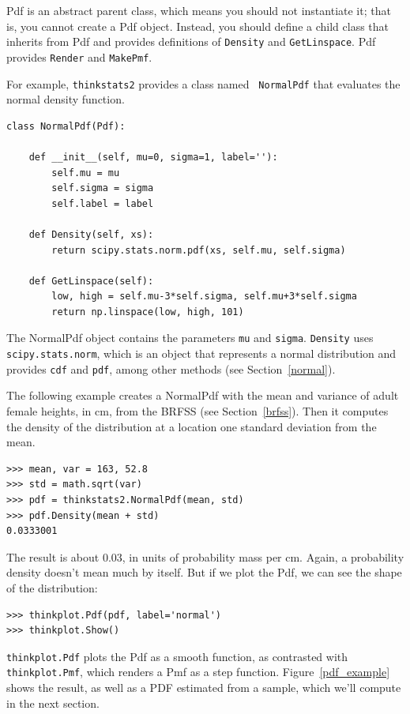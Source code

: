 \documentclass[12pt]{book}
\begin{document}
Pdf is an abstract parent class, which means you should not
instantiate it; that is, you cannot create a Pdf object.  Instead, you
should define a child class that inherits from Pdf and provides
definitions of {\tt Density} and {\tt GetLinspace}.  Pdf provides
{\tt Render} and {\tt MakePmf}.

For example, {\tt thinkstats2} provides a class named {\tt
  NormalPdf} that evaluates the normal density function.

\begin{verbatim}
class NormalPdf(Pdf):

    def __init__(self, mu=0, sigma=1, label=''):
        self.mu = mu
        self.sigma = sigma
        self.label = label

    def Density(self, xs):
        return scipy.stats.norm.pdf(xs, self.mu, self.sigma)

    def GetLinspace(self):
        low, high = self.mu-3*self.sigma, self.mu+3*self.sigma
        return np.linspace(low, high, 101)
\end{verbatim}

The NormalPdf object contains the parameters {\tt mu} and
{\tt sigma}.  {\tt Density} uses
{\tt scipy.stats.norm}, which is an object that represents a normal
distribution and provides {\tt cdf} and {\tt pdf}, among other
methods (see Section~\ref{normal}).

The following example creates a NormalPdf with the mean and variance
of adult female heights, in cm, from the BRFSS (see
Section~\ref{brfss}).  Then it computes the density of the
distribution at a location one standard deviation from the mean.

\begin{verbatim}
>>> mean, var = 163, 52.8
>>> std = math.sqrt(var)
>>> pdf = thinkstats2.NormalPdf(mean, std)
>>> pdf.Density(mean + std)
0.0333001
\end{verbatim}

The result is about 0.03, in units of probability mass per cm.
Again, a probability density doesn't mean much by itself.  But if
we plot the Pdf, we can see the shape of the distribution:

\begin{verbatim}
>>> thinkplot.Pdf(pdf, label='normal')
>>> thinkplot.Show()
\end{verbatim}

{\tt thinkplot.Pdf} plots the Pdf as a smooth function,
as contrasted with {\tt thinkplot.Pmf}, which renders a Pmf as a
step function.  Figure~\ref{pdf_example} shows the result, as well
as a PDF estimated from a sample, which we'll compute in the next
section.
\end{document}

